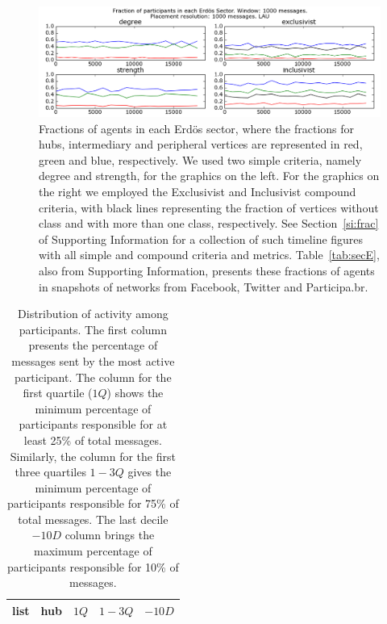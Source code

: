 \documentclass[%
	aip,
	jmp,%
	amsmath,amssymb,
	reprint,%
]{revtex4-1}
\begin{document}
\begin{figure} 
	\centering
	\includegraphics[width=\textwidth]{figs/InText-WLAU-S1000}
	\caption{Fractions of agents in each Erd\"os sector, where the fractions for hubs, intermediary and peripheral vertices are represented in red, green and blue, respectively. We used two simple criteria, namely degree and strength, for the graphics on the left. For the graphics on the right we employed the Exclusivist and Inclusivist compound criteria, with black lines representing the fraction of vertices without class and with more than one class, respectively. See Section~\ref{si:frac} of Supporting Information for a collection of such timeline figures with all simple and compound criteria and metrics. Table~\ref{tab:secE}, also from Supporting Information, presents these fractions of agents in snapshots of networks from Facebook, Twitter and Participa.br.}
	\label{fig:sectIL}
\end{figure}


\begin{table}[h]
	\caption{Distribution of activity among participants. The first column presents the percentage of messages sent by the most active participant. The column for the first quartile ($1Q$) shows the minimum percentage of participants responsible for at least 25\% of total messages. Similarly, the column for the first three quartiles $1-3Q$ gives the minimum percentage of participants responsible for 75\% of total messages. The last decile $-10D$ column brings the maximum percentage of participants responsible for 10\% of messages.}
	\begin{center}
		\begin{tabular}{ | l ||  c | c | c | c | }
			\hline
			list & hub & $ 1Q $ & $ 1-3Q $ & $-10D$ \\ \hline
			
		\end{tabular}
	\end{center}
	\label{autores}
\end{table}
\end{document}

